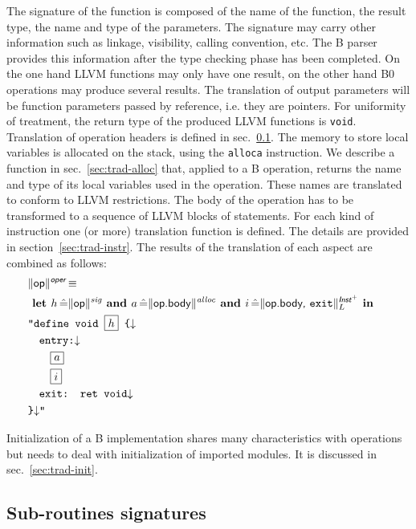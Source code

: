 \documentclass{llncs}
\newcommand{\trad}[2]{\ensuremath{\lVert \textsf{#1} \rVert^{\textit{#2}}}}
\newcommand{\nl}[0]{\ensuremath{\downarrow}}
\DeclareMathOperator{\isdef}{\equiv}
\newcommand{\llvm}[1]{\texttt{#1}}
\newcommand{\B}[1]{\textsf{#1}}
\newcommand{\ListOf}[1]{$\mbox{#1}^+$}
\newcommand{\LET}[0]{\textbf{ let }}
\DeclareMathOperator{\BE}{\hat{=}}
\newcommand{\IN}[0]{\textbf{ in }}
\newcommand{\AND}[0]{\textbf{ and }}
\newcommand{\PH}[1]{\framebox{$#1$}}
\begin{document}
The signature of the function is composed of the name of the function, the
result type, the name and type of the parameters. The signature may carry other
information such as linkage, visibility, calling convention, etc. The B parser
provides this information after the type checking phase has been completed.  On
the one hand LLVM functions may only have one result, on the other hand B0
operations may produce several results. The translation of output parameters
will be function parameters passed by reference, i.e. they are pointers. For
uniformity of treatment, the return type of the produced LLVM functions is
\llvm{void}. Translation of operation headers is defined in
sec.~\ref{sec:trad-header}. The memory to store local variables is allocated on
the stack, using the \llvm{alloca} instruction. We describe a function in
sec.~\ref{sec:trad-alloc} that, applied to a B operation, returns the name and
type of its local variables used in the operation. These names are translated to
conform to LLVM restrictions. The body of the operation has to be transformed to
a sequence of LLVM blocks of statements. For each kind of instruction one (or
more) translation function is defined. The details are provided in
section~\ref{sec:trad-instr}.  The results of the translation of each aspect are
combined as follows:
\begin{align*}
\begin{split}
  \lefteqn{\trad{\B{op}}{\B{oper}} \isdef} \\
  & \LET h \BE \trad{\B{op}}{sig} \AND   a \BE \trad{\B{op.body}}{alloc} \AND i \BE \trad{\B{op.body}, \llvm{exit}}{\ListOf{\B{Inst}}}_L \IN  \\
  & \llvm{"define void \PH{h} \{\nl} \\
  & \quad \llvm{entry:\nl} \\
  & \quad \quad \PH{a} \\
  & \quad \quad \PH{i} \\
  & \quad \llvm{exit: ret void\nl} \\
  & \llvm{\}\nl"}
\end{split}
\end{align*}

Initialization of a B implementation shares many characteristics with operations
but needs to deal with initialization of imported modules. It is discussed in
sec.~\ref{sec:trad-init}.

\subsection{Sub-routines signatures}
\label{sec:trad-header}
\end{document}
